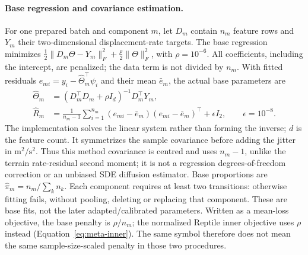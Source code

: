 \documentclass[11pt]{article}
\begin{document}
\paragraph{Base regression and covariance estimation.}
\label{sec:method-base-fit}
For one prepared batch and component \(m\), let \(D_m\) contain \(n_m\)
feature rows and \(Y_m\) their two-dimensional displacement-rate targets.
The base regression minimizes
\(\tfrac12\|D_m\Theta-Y_m\|_F^2+\tfrac\rho2\|\Theta\|_F^2\),
with \(\rho=10^{-6}\). All coefficients, including the intercept, are
penalized; the data term is not divided by \(n_m\). With fitted residuals
\(e_{mi}=y_i-\widehat\Theta_m^\top\psi_i\) and their mean \(\bar e_m\),
the actual base parameters are
\begin{align}
 \widehat\Theta_m&=(D_m^\top D_m+\rho I_d)^{-1}D_m^\top Y_m,
 \label{eq:method-base-ridge}\\
 \widehat R_m&=\frac1{n_m-1}\sum_{i=1}^{n_m}
 (e_{mi}-\bar e_m)(e_{mi}-\bar e_m)^\top+\epsilon I_2,
 \qquad \epsilon=10^{-8}.
 \label{eq:method-base-covariance}
\end{align}
The implementation solves the linear system rather than forming the inverse;
\(d\) is the feature count. It symmetrizes the sample covariance before adding
the jitter in \(\mathrm{m}^2/\mathrm{s}^2\). Thus this method covariance is
centred and uses \(n_m-1\), unlike the terrain rate-residual second moment;
it is not a regression degrees-of-freedom correction or an unbiased SDE
diffusion estimator. Base proportions are \(\widehat\pi_m=n_m/\sum_k n_k\).
Each component requires at least two transitions: otherwise fitting fails,
without pooling, deleting or replacing that component. These are base fits,
not the later adapted/calibrated parameters. Written as a mean-loss objective,
the base penalty is \(\rho/n_m\); the normalized Reptile inner objective uses
\(\rho\) instead (Equation~\eqref{eq:meta-inner}). The same symbol therefore
does not mean the same sample-size-scaled penalty in those two procedures.
\end{document}
